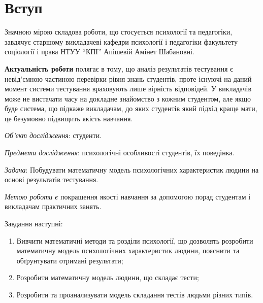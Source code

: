 \chapter*{Вступ}

Значною мірою складова роботи, що стосується психології та педагогіки, завдячує
старшому викладачеві кафедри психології і педагогіки
факультету соціології і права НТУУ ``КПІ'' Апішевій Амінет Шабановні.

\textbf{Актуальність роботи} полягає в тому, що
аналіз результатів тестування є невід’ємною частиною перевірки рівня знань
студентів, проте існуючі на даний момент системи тестування враховують
лише вірність відповідей.
У викладачів може не вистачати часу на докладне знайомство з кожним студентом,
але якщо буде система, що підкаже викладачам, до яких
студентів який підхід краще мати, це безумовно підвищить якість навчання.

\textit{Об’єкт дослідження}:
студенти.

\textit{Предмети дослідження}:
психологічні особливості студентів, їх поведінка.

\textit{Задача}:
Побудувати математичну модель психологічних характеристик людини на основі
результатів тестування.

\textit{Метою роботи є}
покращення якості навчання за допомогою порад студентам і викладачам
практичних занять.

Завдання наступні:
\begin{enumerate}
  \item
    Вивчити математичні методи та розділи психології, що дозволять розробити
    математичну модель психологічних характеристик людини,
    пояснити та обґрунтувати отримані результати;
  \item
    Розробити математичну модель людини, що складає тести;
  \item
    Розробити та проанализувати модель складання тестів людьми різних типів.
\end{enumerate}

